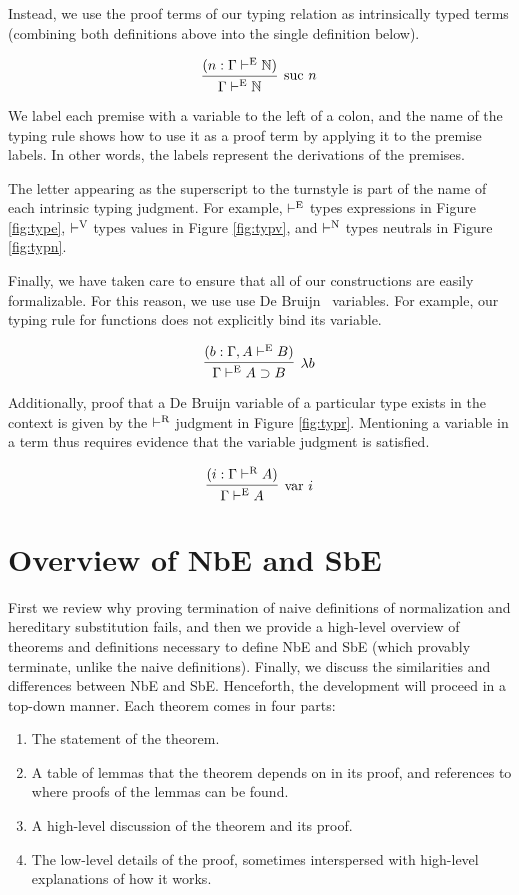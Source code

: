 \documentclass{llncs}
\newcommand{\reffig}[1]{Figure \ref{fig:#1}}
\def\arr{\supset}
\def\lam{\lambda}
\def\nat{\mathbb{N}}
\newcommand{\turn}[1]{\vdash^\con{#1}}
\newcommand{\con}[1]{\textmd{#1}}
\newcommand{\fun}[1]{\textmd{#1}}
\newcommand{\type}[1]{\Gamma \turn{E} #1}
\newcommand{\ctype}[2]{\Gamma , #1 \turn{E} #2}
\newcommand{\typr}[1]{\Gamma \turn{R} #1}
\begin{document}
Instead, we use the proof terms of our typing relation as
intrinsically typed terms (combining both definitions above into the
single definition below).

$$
\infer
  [\con{suc} ~ n]
  {\type{\nat}}
{
  (n : \type{\nat})
}
$$

We label each premise with a variable to
the left of a colon, and the name of the typing rule shows how to use
it as a proof term by applying it to the premise labels. In other
words, the labels represent the derivations of the premises.

The letter appearing as the superscript to the turnstyle is part of
the name of each intrinsic typing judgment. For example, $\turn{E}$
types expressions in \reffig{type}, $\turn{V}$ types values in
\reffig{typv}, and $\turn{N}$ types neutrals in \reffig{typn}.

Finally, we have taken care to ensure that all of our constructions
are easily formalizable. For this reason, we
use use De Bruijn~\cite{TODO} variables. For example, our typing rule
for functions does not explicitly bind its variable.

$$
\infer
  [\lam b]
  {\type{A \arr B}}
{
  (b : \ctype{A}{B})
}
$$

Additionally, proof that a De Bruijn variable of a particular type
exists in the context is given by the $\turn{R}$ judgment in
\reffig{typr}. Mentioning a variable in a term thus requires evidence
that the variable judgment is satisfied.

$$
\infer
  [\fun{var} ~ i]
  {\type{A}}
{
  (i : \typr{A})
}
$$

\section{Overview of NbE and SbE}
\label{sec:overview}

First we review why proving termination of naive definitions of
normalization and hereditary substitution fails, and then we provide a
high-level overview of theorems and definitions necessary to define NbE
and SbE (which provably terminate, unlike the naive definitions).
Finally, we discuss the similarities and differences between NbE and
SbE.
Henceforth, the development will proceed in a top-down manner.
Each theorem comes in four parts:

\begin{enumerate}
\item{The statement of the theorem.}
\item{A table of lemmas that the theorem depends on in its proof, and
  references to where proofs of the lemmas can be found.}
\item{A high-level discussion of the theorem and its proof.}
\item{The low-level details of the proof, sometimes interspersed with
  high-level explanations of how it works.}
\end{enumerate}
\end{document}
